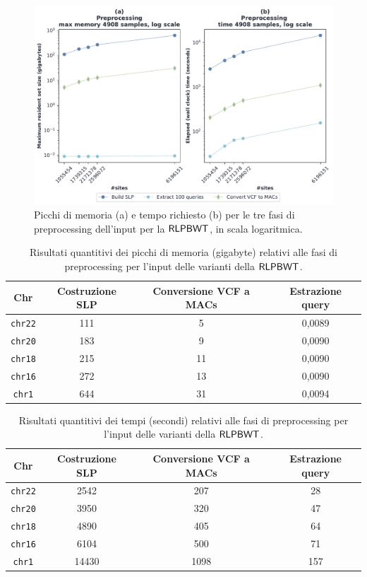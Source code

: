 \begin{figure}
  \centering
  \includegraphics[width=\linewidth]{img/prep_mem_time.pdf}
  \caption{Picchi di memoria (a) e tempo richiesto (b) per le tre fasi di
    preprocessing dell'input per la $\mbox{\rm {\sf RLPBWT}}$, in scala logaritmica.}
  \label{fig:prechr}
\end{figure}
\begin{table}
  \centering
  \small
  \caption{Risultati quantitivi dei picchi di memoria (gigabyte) relativi alle
    fasi di 
    preprocessing per l'input delle varianti della $\mbox{\rm {\sf RLPBWT}}$.}
  \label{tab:prepmem}
  \begin{tabular}{c||c|c|c}
    \textbf{Chr} & \textbf{Costruzione SLP} & \textbf{Conversione VCF a MACs}
    & \textbf{Estrazione query}\\
    \hline
    \hline
    \texttt{chr22} & 111 & 5 & 0,0089  \\
    \texttt{chr20} & 183 & 9 & 0,0090 \\
    \texttt{chr18} & 215 & 11 & 0,0090 \\
    \texttt{chr16} & 272 & 13 & 0,0090 \\
    \texttt{chr1} & 644 & 31 & 0,0094 
  \end{tabular}
\end{table}
\begin{table}
  \centering
  \small
  \caption{Risultati quantitivi dei tempi (secondi) relativi alle fasi di
    preprocessing per l'input delle varianti della $\mbox{\rm {\sf RLPBWT}}$.}
  \label{tab:preptime}
  \begin{tabular}{c||c|c|c}
    \textbf{Chr} & \textbf{Costruzione SLP} & \textbf{Conversione VCF a MACs}
    & \textbf{Estrazione query}\\
    \hline
    \hline
    \texttt{chr22} & 2542 & 207 & 28 \\
    \texttt{chr20} & 3950 & 320 & 47 \\
    \texttt{chr18} & 4890 & 405 & 64 \\
    \texttt{chr16} & 6104 & 500 & 71 \\
    \texttt{chr1} & 14430 & 1098 & 157
  \end{tabular}
\end{table}
